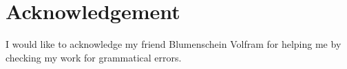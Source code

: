 \chapter*{Acknowledgement}

I would like to acknowledge my friend Blumenschein Volfram for helping me by checking my work for grammatical errors.